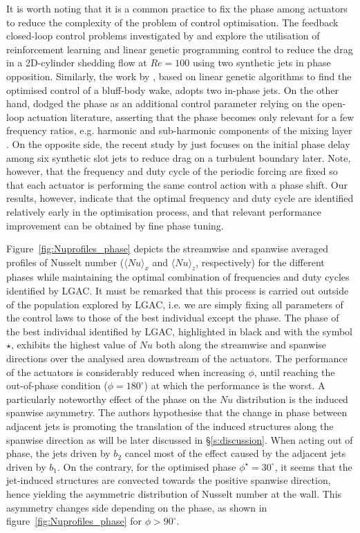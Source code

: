 It is worth noting that it is a common practice to fix the phase among actuators to reduce the complexity of the problem of control optimisation. The feedback closed-loop control problems investigated by \citet{rabault2019JFM} and \citet{Castellanos2022LGPCvsRL} explore the utilisation of reinforcement learning and linear genetic programming control to reduce the drag in a 2D-cylinder shedding flow at $Re=100$ using two synthetic jets in phase opposition. Similarly, the work by \citet{minelli2020lgac}, based on linear genetic algorithms to find the optimised control of a bluff-body wake, adopts two in-phase jets. On the other hand, \citet{Wu2018jet} dodged the phase as an additional control parameter relying on the open-loop actuation literature, asserting that the phase becomes only relevant for a few frequency ratios, e.g. harmonic and sub-harmonic components of the mixing layer \citep{monkewitz1988phase}. On the opposite side, the recent study by \citet{Yu2021GA_drag_slot_jets} just focuses on the initial phase delay among six synthetic slot jets to reduce drag on a turbulent boundary later. Note, however, that the frequency and duty cycle of the periodic forcing are fixed so that each actuator is performing the same control action with a phase shift. Our results, however, indicate that the optimal frequency and duty cycle are identified relatively early in the optimisation process, and that relevant performance improvement can be obtained by fine phase tuning.

Figure~\ref{fig:Nuprofiles_phase} depicts the streamwise and spanwise averaged profiles of Nusselt number ($\langle Nu \rangle_x$ and $\langle Nu \rangle_z$, respectively) for the different phases while maintaining the optimal combination of frequencies and duty cycles identified by LGAC. It must be remarked that this process is carried out outside of the population explored by LGAC, i.e. we are simply fixing all parameters of the control laws to those of the best individual except the phase. The phase of the best individual identified by LGAC, highlighted in black and with the symbol $\star$, exhibits the highest value of $Nu$ both along the streamwise and spanwise directions over the analysed area downstream of the actuators. The performance of the actuators is considerably reduced when increasing $\phi$, until reaching the out-of-phase condition ($\phi = 180^\circ$) at which the performance is the worst. A particularly noteworthy effect of the phase on the $Nu$ distribution is the induced spanwise asymmetry. The authors hypothesise that the change in phase between adjacent jets is promoting the translation of the induced structures along the spanwise direction as will be later discussed in \S\ref{s:discussion}. When acting out of phase, the jets driven by $b_2$ cancel most of the effect caused by the adjacent jets driven by $b_1$. On the contrary, for the optimised phase $\phi^\star=30^\circ$, it seems that the jet-induced structures are convected towards the positive spanwise direction, hence yielding the asymmetric distribution of Nusselt number at the wall. This asymmetry changes side depending on the phase, as shown in figure~\ref{fig:Nuprofiles_phase} for $\phi>90^\circ$.

